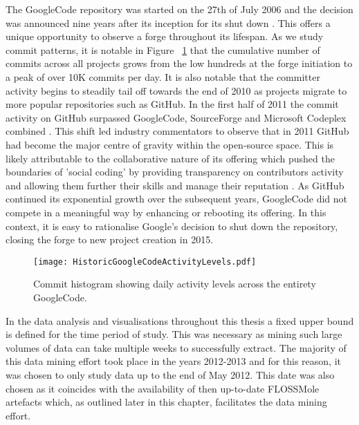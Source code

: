 The GoogleCode repository was started on the 27th of July 2006 \citep{shankland2006google} and the decision was announced nine years after its inception for its shut down \citep{dibona2006bidding}. This offers a unique opportunity to observe a forge throughout its lifespan. As we study commit patterns, it is notable in Figure ~\ref{fig:HistoricGoogleCodeActivityLevels} that the cumulative number of commits across all projects grows from the low hundreds at the forge initiation to a peak of over 10K commits per day. It is also notable that the committer activity begins to steadily tail off towards the end of 2010 as projects migrate to more popular repositories such as GitHub. In the first half of 2011 the commit activity on GitHub surpassed GoogleCode, SourceForge and Microsoft Codeplex combined \citep{redmonk2011}. This shift led industry commentators to observe that in 2011 GitHub had become the major centre of gravity within the open-source space. This is likely attributable to the collaborative nature of its offering which pushed the boundaries of 'social coding' by providing transparency on contributors activity and allowing them further their skills and manage their reputation \citep{dabbish2012social}. As GitHub continued its exponential growth over the subsequent years, GoogleCode did not compete in a meaningful way by enhancing or rebooting its offering. In this context, it is easy to rationalise Google's decision to shut down the repository, closing the forge to new project creation in 2015.
 
\begin{figure}[htbp!] 
\centering    
\texttt{[image: HistoricGoogleCodeActivityLevels.pdf]}
\caption{Commit histogram showing daily activity levels across the entirety GoogleCode.}
\label{fig:HistoricGoogleCodeActivityLevels}
\end{figure}

In the data analysis and visualisations throughout this thesis a fixed upper bound is defined for the time period of study. This was necessary as mining such large volumes of data can take multiple weeks to successfully extract. The majority of this data mining effort took place in the years 2012-2013 and for this reason, it was chosen to only study data up to the end of May 2012. This date was also chosen as it coincides with the availability of then up-to-date FLOSSMole artefacts which, as outlined later in this chapter, facilitates the data mining effort.  

